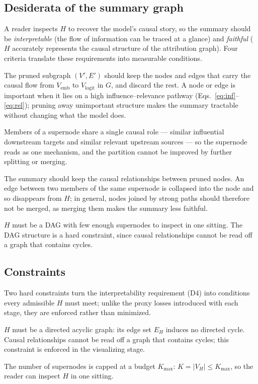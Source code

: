 \documentclass[../main.tex]{subfiles}
\begin{document}
\subsection{Desiderata of the summary graph}
A reader inspects $H$ to recover the model's causal story, so the summary should
be \emph{interpretable} (the flow of information can be traced at a glance) and
\emph{faithful} ($H$ accurately represents the causal structure of the attribution
graph). Four criteria translate these requirements into measurable conditions.
\begin{description}[leftmargin=2.0em,style=nextline,topsep=2pt,itemsep=3pt]
\item[(D1) Retain important nodes and edges.] The pruned subgraph $(V', E')$
should keep the nodes and edges that carry the causal flow from $V_{\text{emb}}$
to $V_{\text{logit}}$ in $G$, and discard the rest. A node or edge is important
when it lies on a high influence--relevance pathway
(Eqs.~\eqref{eq:inf}--\eqref{eq:rel}); pruning away unimportant structure makes
the summary tractable without changing what the model does.
\item[(D2) Atomicity.] Members of a supernode share a single causal role ---
similar influential downstream targets and similar relevant upstream sources ---
so the supernode reads as one mechanism, and the partition cannot be improved by
further splitting or merging.
\item[(D3) Causal-information preservation.] The summary should keep the causal
relationships between pruned nodes. An edge between two members of the same
supernode is collapsed into the node and so disappears from $H$; in general,
nodes joined by strong paths should therefore not be merged, as merging them makes
the summary less faithful.
\item[(D4) Interpretability.] $H$ must be a DAG with few enough supernodes to
inspect in one sitting. The DAG structure is a hard constraint, since causal
relationships cannot be read off a graph that contains cycles.
\end{description}

\subsection{Constraints}\label{sec:constraints}
Two hard constraints turn the interpretability requirement (D4) into conditions
every admissible $H$ must meet; unlike the proxy losses introduced with each stage,
they are enforced rather than minimized.
\begin{description}[leftmargin=2.0em,style=nextline,topsep=2pt,itemsep=3pt]
\item[(C1) Acyclicity.] $H$ must be a directed acyclic graph: its edge set $E_H$
induces no directed cycle. Causal relationships cannot be read off a graph that
contains cycles; this constraint is enforced in the visualizing stage.
\item[(C2) Complexity budget.] The number of supernodes is capped at a budget
$K_{\max}$: $K = |V_H| \le K_{\max}$, so the reader can inspect $H$ in one sitting.
\end{description}
\end{document}
